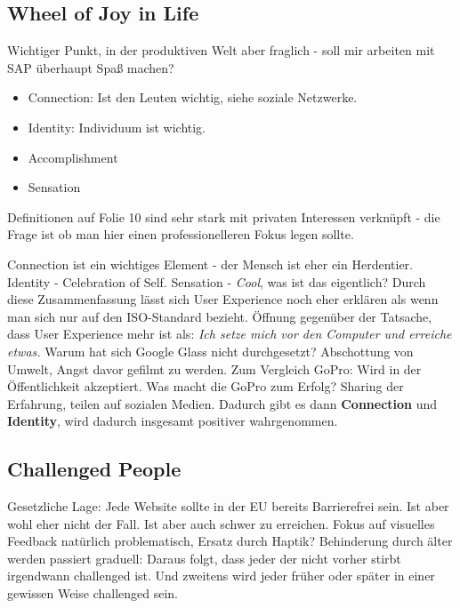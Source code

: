 \subsection{Wheel of Joy in Life}

Wichtiger Punkt, in der produktiven Welt aber fraglich - soll mir arbeiten mit 
SAP überhaupt Spaß machen?

\begin{itemize}
\item Connection: Ist den Leuten wichtig, siehe soziale Netzwerke.
\item Identity: Individuum  ist wichtig.
\item Accomplishment
\item Sensation
\end{itemize}

Definitionen auf Folie 10 sind sehr stark mit privaten Interessen verknüpft -
die Frage ist ob man hier einen professionelleren Fokus legen sollte.

Connection ist ein wichtiges Element - der Mensch ist eher ein Herdentier.
Identity - Celebration of Self. 
Sensation - \textit{Cool}, was ist das eigentlich?
Durch diese Zusammenfassung lässt sich User Experience noch eher erklären als 
wenn man sich nur auf den ISO-Standard bezieht.
Öffnung gegenüber der Tatsache, dass User Experience mehr ist als: \textit{Ich setze mich vor den Computer und erreiche etwas.}
\noindent{}
Warum hat sich Google Glass nicht durchgesetzt? Abschottung von Umwelt, Angst davor
gefilmt zu werden. 
Zum Vergleich GoPro: Wird in der Öffentlichkeit akzeptiert. 
Was macht die GoPro zum Erfolg? Sharing der Erfahrung, teilen auf sozialen Medien.
Dadurch gibt es dann \textbf{Connection} und \textbf{Identity}, wird dadurch 
insgesamt positiver wahrgenommen.
\subsection{Challenged People}
Gesetzliche Lage: Jede Website sollte in der EU bereits Barrierefrei sein. Ist 
aber wohl eher nicht der Fall. Ist aber auch schwer zu erreichen.
Fokus auf visuelles Feedback natürlich problematisch, Ersatz durch Haptik?
\noindent{}
Behinderung durch älter werden passiert graduell: Daraus folgt, dass jeder der nicht
vorher stirbt irgendwann challenged ist. Und zweitens wird jeder früher oder später
in einer gewissen Weise challenged sein.

